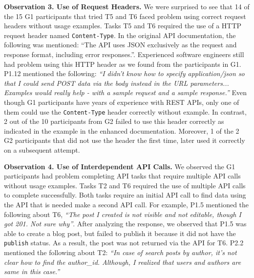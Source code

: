 \vspace{1mm}
\hspace{-5mm}
\vspace{0.5mm}

\textbf{Observation 3. Use of Request Headers.} We were surprised to see that 14 of the 15 G1 participants that tried T5 and T6 faced problem using correct request headers without usage examples. Tasks T5 and T6 required the use of a HTTP request header named \lstinline{Content-Type}. In the original API documentation, the following was mentioned: ``The API uses JSON exclusively as the request and response format, including error responses.''. Experienced software engineers still had problem using this HTTP header as we found from the participants in G1. P1.12 mentioned the following: \textit{``I didn't know how to specify application/json so that I could send POST data via the body instead in the URL parameters... Examples would really help - with a sample request and a sample response.''}  Even though G1 participants have years of experience with REST APIs, only one of them could use the \lstinline{Content-Type} header correctly without example. In contrast, 2 out of the 10 participants from G2 failed to use this header correctly as indicated in the example in the enhanced documentation. Moreover, 1 of the 2 G2 participants that did not use the header the first time, later used it correctly on a subsequent attempt.

\vspace{1mm}
\hspace{-5mm}
\vspace{0.5mm}

\textbf{Observation 4. Use of Interdependent API Calls.} We observed the G1 participants had problem completing API tasks that require multiple API calls without usage examples. Tasks T2 and T6 required the use of multiple API calls to complete successfully. Both tasks require an initial API call to find data using the API that is needed make a second API call. For example, P1.5 mentioned the following about T6, \textit{``The post I created is not visible and not editable, though I got 201. Not sure why''}. After analyzing the response, we observed that P1.5 was able to create a blog post, but failed to publish it because it did not have the \lstinline{publish} status. As a result, the post was not returned via the API for T6. P2.2 mentioned the following about T2: \textit{``In case of search posts by author, it's not clear how to find the author\_id. Although, I realized that users and authors are same in this case.''}

